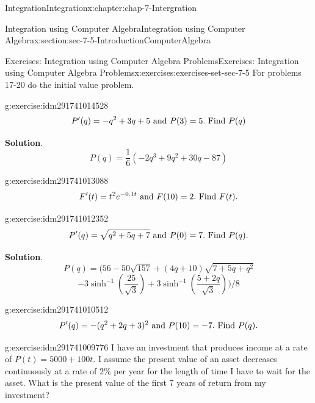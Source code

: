 \documentclass[oneside,10pt,]{book}
\numberwithin{equation}{section}
\begin{document}
\begin{chapterptx}{Integration}{}{Integration}{}{}{x:chapter:chap-7-Intergration}
\begin{sectionptx}{Integration using Computer Algebra}{}{Integration using Computer Algebra}{}{}{x:section:sec-7-5-IntroductionComputerAlgebra}
\begin{exercises-subsection}{Exercises: Integration using Computer Algebra Problems}{}{Exercises: Integration using Computer Algebra Problems}{}{}{x:exercises:exercises-set-sec-7-5}
For problems 17-20 do the initial value problem.%
\begin{divisionexercise}{17}{}{}{g:exercise:idm291741014528}%
%
\begin{equation*}
P' (q)=-q^2+3q+5\hbox{ and }P(3)=5.\hbox{ Find } P(q)
\end{equation*}
\par\smallskip%
\noindent\textbf{Solution}.\hypertarget{g:solution:idm291741013952}{}\quad{}%
\begin{equation*}
P(q)=\frac{1}{6} (-2q^3+9q^2+30q-87)
\end{equation*}
\end{divisionexercise}%
\begin{divisionexercise}{18}{}{}{g:exercise:idm291741013088}%
%
\begin{equation*}
F' (t)=t^2 e^{-0.1t} \hbox{ and } F(10)=2.  \hbox{ Find } F(t).
\end{equation*}
\end{divisionexercise}%
\begin{divisionexercise}{19}{}{}{g:exercise:idm291741012352}%
%
\begin{equation*}
P' (q)=\sqrt{q^2+5q+7} \hbox{ and } P(0)=7.  \hbox{ Find } P(q).
\end{equation*}
\par\smallskip%
\noindent\textbf{Solution}.\hypertarget{g:solution:idm291741011760}{}\quad{}%
\begin{equation*}
P(q) = (56 - 50 \sqrt{157} + (4q+10) \sqrt{7 + 5 q + q^2} 
\end{equation*}
%
\begin{equation*}
- 3 \sinh^{-1}\left(\frac{25}{\sqrt{3}}\right)+ 3 \sinh^{-1}\left(\frac{5 + 2 q}{\sqrt{3}}\right))/8
\end{equation*}
\end{divisionexercise}%
\begin{divisionexercise}{20}{}{}{g:exercise:idm291741010512}%
%
\begin{equation*}
P' (q)=-(q^2+2q+3)^2 \hbox{ and } P(10)=-7.  \hbox{ Find } P(q).
\end{equation*}
\end{divisionexercise}%
\begin{divisionexercise}{21}{}{}{g:exercise:idm291741009776}%
I have an investment that produces income at a rate of \(P(t)=5000+100t\).  I assume the present value of an asset decreases continuously at a rate of 2\% per year for the length of time I have to wait for the asset.  What is the present value of the first 7 years of return from my investment?%

\end{divisionexercise}
\end{exercises-subsection}
\end{sectionptx}
\end{chapterptx}
\end{document}
